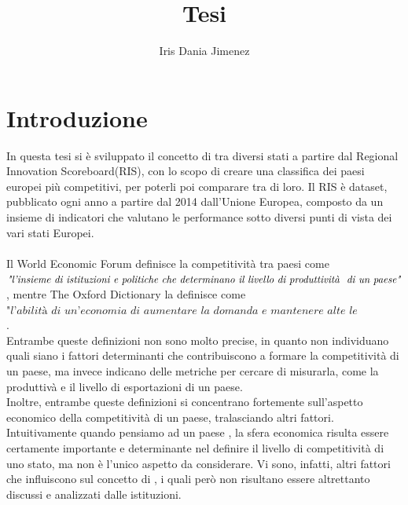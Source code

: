 \documentclass[12pt]{article}
\begin{document}
\title{Tesi}

\author{Iris Dania Jimenez}

\maketitle

\tableofcontents
\newpage

\section{Introduzione}

In questa tesi si è sviluppato il concetto di  tra diversi stati a partire dal Regional Innovation Scoreboard(RIS),
con lo scopo di creare una classifica dei paesi europei più competitivi, per poterli poi comparare tra di loro.  
Il RIS è dataset, pubblicato ogni anno a partire dal 2014 dall'Unione Europea, composto da un insieme di indicatori che valutano 
le performance sotto diversi punti di vista dei vari stati Europei.  \\
\\
Il World Economic Forum definisce la competitività tra paesi come \linebreak
$\textit{"l'insieme di istituzioni e politiche che determinano 
il livello di produttività $\newline$ di un paese"}$, mentre The Oxford Dictionary la definisce come \linebreak
$\textit{"l'abilità di un'economia di aumentare la domanda e mantenere alte le esportazioni"}$. \\
Entrambe queste definizioni non sono molto precise, in quanto non individuano quali siano i fattori determinanti che contribuiscono a 
formare la competitività di un paese, ma invece indicano delle metriche per cercare di misurarla, come la produttivà e il livello 
di esportazioni di un paese. \\
Inoltre, entrambe queste definizioni si concentrano fortemente sull'aspetto economico della competitività di un paese, tralasciando altri fattori. 
Intuitivamente quando pensiamo ad un paese , la sfera economica risulta essere certamente importante e determinante nel 
definire il livello di competitività di uno stato, ma non è l'unico aspetto da considerare. Vi sono, infatti, altri fattori che
influiscono sul concetto di , i quali però non risultano essere altrettanto discussi e analizzati dalle 
istituzioni.  \\
\end{document}
